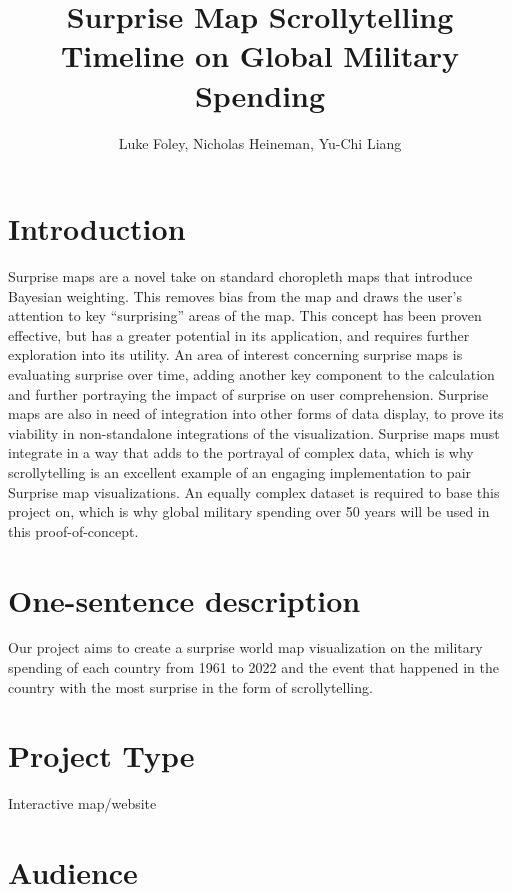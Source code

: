 \documentclass{proc}
\begin{document}
\title{Surprise Map Scrollytelling Timeline on Global Military Spending}

\author{Luke Foley, Nicholas Heineman, Yu-Chi Liang}

\maketitle

\section{Introduction}

Surprise maps are a novel take on standard choropleth maps that introduce Bayesian weighting. This removes bias from the map and draws the user’s attention to key “surprising” areas of the map. This concept has been proven effective, but has a greater potential in its application, and requires further exploration into its utility. An area of interest concerning surprise maps is evaluating surprise over time, adding another key component to the calculation and further portraying the impact of surprise on user comprehension. Surprise maps are also in need of integration into other forms of data display, to prove its viability in non-standalone integrations of the visualization. Surprise maps must integrate in a way that adds to the portrayal of complex data, which is why scrollytelling is an excellent example of an engaging implementation to pair Surprise map visualizations. An equally complex dataset is required to base this project on, which is why global military spending over 50 years will be used in this proof-of-concept.


\section{One-sentence description}

Our project aims to create a surprise world map visualization on the military spending of each country from 1961 to 2022 and the event that happened in the country with the most surprise in the form of scrollytelling. 


\section{Project Type}

Interactive map/website

\section{Audience} 
\end{document}
